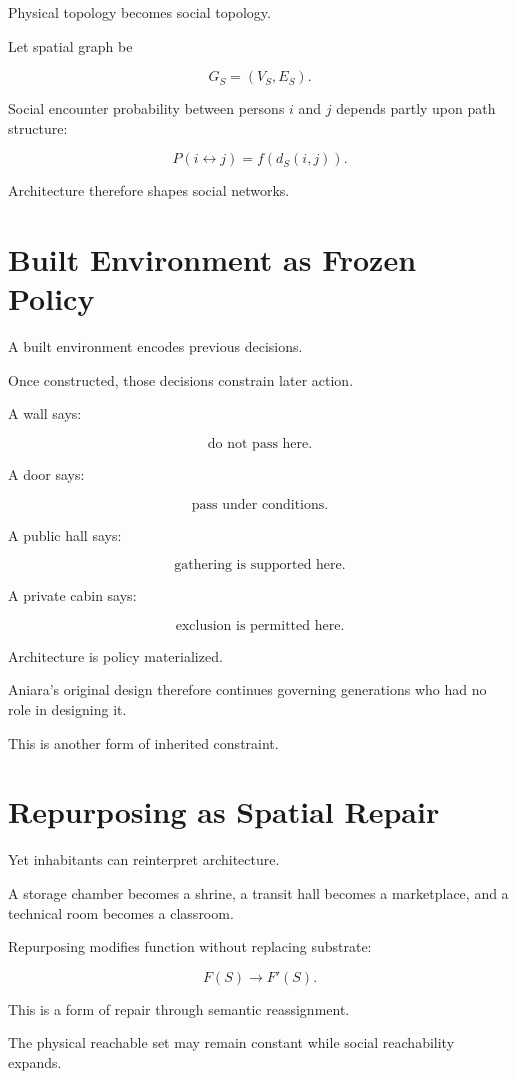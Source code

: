 \documentclass[11pt,oneside]{book}
\theoremstyle{definition}
\theoremstyle{remark}
\begin{document}
Physical topology becomes social topology.

Let spatial graph be

\[
G_S=(V_S,E_S).
\]

Social encounter probability between persons \(i\) and \(j\) depends partly upon path structure:

\[
P(i\leftrightarrow j)
=
f(d_S(i,j)).
\]

Architecture therefore shapes social networks.

\section{Built Environment as Frozen Policy}

A built environment encodes previous decisions.

Once constructed, those decisions constrain later action.

A wall says:

\[
\text{do not pass here}.
\]

A door says:

\[
\text{pass under conditions}.
\]

A public hall says:

\[
\text{gathering is supported here}.
\]

A private cabin says:

\[
\text{exclusion is permitted here}.
\]

Architecture is policy materialized.

Aniara's original design therefore continues governing generations who had no role in designing it.

This is another form of inherited constraint.

\section{Repurposing as Spatial Repair}

Yet inhabitants can reinterpret architecture.

A storage chamber becomes a shrine, a transit hall becomes a marketplace, and a technical room becomes a classroom.

Repurposing modifies function without replacing substrate:

\[
F(S)
\rightarrow
F'(S).
\]

This is a form of repair through semantic reassignment.

The physical reachable set may remain constant while social reachability expands.
\end{document}
